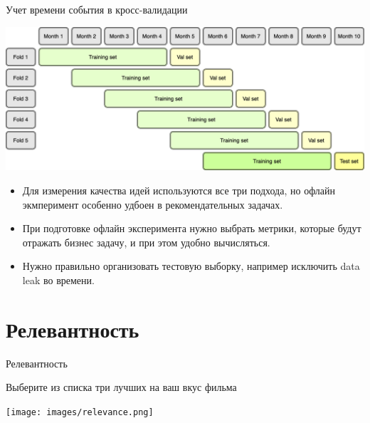 \documentclass[11pt,aspectratio=169,handout]{beamer}
\begin{document}
\begin{frame}{Учет времени события в кросс-валидации}

\vfill

\begin{center}
\includegraphics[scale=0.32]{images/temporal-cross-validation.png}
\end{center}

\vfill

\end{frame}

\begin{frame}{}

\begin{tcolorbox}[colback=info!5,colframe=info!80,title=]
\begin{itemize}
\item Для измерения качества идей используются все три подхода, но офлайн экмперимент особенно удбоен в рекомендательных задачах.
\item При подготовке офлайн эксперимента нужно выбрать метрики, которые будут отражать бизнес задачу, и при этом удобно вычисляться.
\item Нужно правильно организовать тестовую выборку, например исключить data leak во времени.
\end{itemize}
\end{tcolorbox}

\end{frame}

\section{Релевантность}

\begin{frame}{Релевантность}

\begin{tcolorbox}[colback=info!5,colframe=info!80,title=]
Выберите из списка три лучших на ваш вкус фильма
\end{tcolorbox}

\begin{center}
\texttt{[image: images/relevance.png]}
\end{center}

\end{frame}
\end{document}

